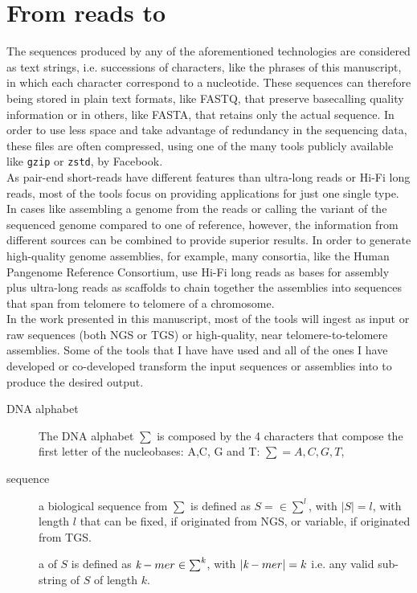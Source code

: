 \section{From reads to \kmers}
The sequences produced by any of the aforementioned technologies are considered as text strings, i.e. successions of characters, like the phrases of this manuscript, in which each character correspond to a nucleotide. These sequences can therefore being stored in plain text formats, like FASTQ, that preserve basecalling quality information or in others, like FASTA, that retains only the actual sequence. In order to use less space and take advantage of redundancy in the sequencing data, these files are often compressed, using one of the many tools publicly available like \texttt{gzip} or \texttt{zstd}, by Facebook. \\
As pair-end short-reads have different features than ultra-long reads or Hi-Fi long reads, most of the tools focus on providing applications for just one single type. In cases like assembling a genome from the reads or calling the variant of the sequenced genome compared to one of reference, however, the information from different sources can be combined to provide superior results. In order to generate high-quality genome assemblies, for example, many consortia, like the Human Pangenome Reference Consortium, use Hi-Fi long reads as bases for assembly plus ultra-long reads as scaffolds to chain together the assemblies into sequences that span from telomere to telomere of a chromosome.\\
In the work presented in this manuscript, most of the tools will ingest as input or raw sequences (both NGS or TGS) or high-quality, near telomere-to-telomere assemblies. Some of the tools that I have have used and all of the ones I have developed or co-developed transform the input sequences or assemblies into \kmers to produce the desired output. \\
\begin{description}
	\item[DNA alphabet] The DNA alphabet $\sum$ is composed by the 4 characters that compose the first letter of the nucleobases: A,C, G and T: $ \sum = {A, C, G, T}$, 
	\item[sequence] a biological sequence from $\sum$ is defined as $ S =\in \sum^{l}$, with $\lvert S \rvert = l $, with length $l$ that can be fixed, if originated from NGS, or variable, if originated from TGS.
	\item[\kmer] a \kmer of $S$ is defined as $ \emph{k}-mer \in \sum^{k}$, with $\lvert \emph{k}-mer \rvert = k $ i.e. any valid sub-string of $S$ of length $k$. 
\end{description}
